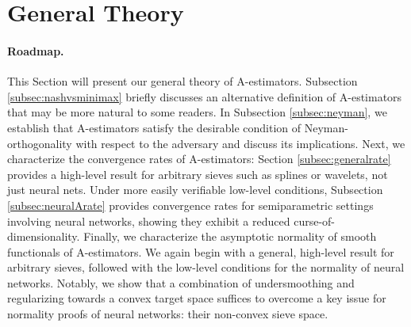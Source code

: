 \documentclass[12pt]{article}
\theoremstyle{myplain}
\theoremstyle{definition}
\theoremstyle{definition}
\theoremstyle{remark}
\numberwithin{equation}{section}
\begin{document}
\section{General Theory}
\label{sec:theory}
\paragraph{Roadmap.} This Section will present our general theory of A-estimators. Subsection \ref{subsec:nashvsminimax} briefly discusses an alternative definition of A-estimators that may be more natural to some readers. In Subsection \ref{subsec:neyman}, we establish that A-estimators satisfy the desirable condition of Neyman-orthogonality with respect to the adversary and discuss its implications. Next, we characterize the convergence rates of A-estimators: Section \ref{subsec:generalrate} provides a high-level result for arbitrary sieves such as splines or wavelets, not just neural nets. Under more easily verifiable low-level conditions, Subsection \ref{subsec:neuralArate} provides convergence rates for semiparametric settings involving neural networks, showing they exhibit a reduced curse-of-dimensionality. Finally, we characterize the asymptotic normality of smooth functionals of A-estimators. We again begin with a general, high-level result for arbitrary sieves, followed with the low-level conditions for the normality of neural networks. Notably, we show that a combination of undersmoothing and regularizing towards a convex target space suffices to overcome a key issue for normality proofs of neural networks: their non-convex sieve space.
\end{document}
